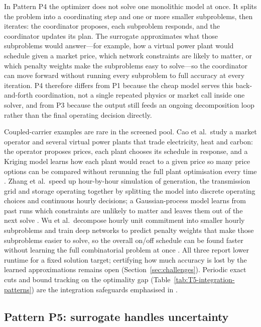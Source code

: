 In Pattern P4 the optimizer does not solve one monolithic model at once.
It splits the problem into a coordinating step and one or more smaller
subproblems, then iterates: the coordinator proposes, each subproblem
responds, and the coordinator updates its plan.
The surrogate approximates what those subproblems would answer---for
example, how a virtual power plant would schedule given a market price,
which network constraints are likely to matter, or which penalty
weights make the subproblems easy to solve---so the coordinator can move
forward without running every subproblem to full accuracy at every
iteration.
P4 therefore differs from P1 because the cheap model serves this
back-and-forth coordination, not a single repeated physics or market
call inside one solver, and from P3 because the output still feeds an
ongoing decomposition loop rather than the final operating decision
directly.

Coupled-carrier examples are rare in the screened pool. Cao et al.\
study a market operator and several virtual power plants that trade
electricity, heat and carbon: the operator proposes prices, each plant
chooses its schedule in response, and a Kriging model learns how each
plant would react to a given price so many price options can be compared
without rerunning the full plant optimisation every time
\cite{Cao2023__2}. Zhang et al.\ speed up hour-by-hour simulation of
generation, the transmission grid and storage operating together by
splitting the model into discrete operating choices and continuous
hourly decisions; a Gaussian-process model learns from past runs which
constraints are unlikely to matter and leaves them out of the next solve
\cite{Zhang2025__4}. Wu et al.\ decompose hourly unit commitment into
smaller hourly subproblems and train deep networks to predict penalty
weights that make those subproblems easier to solve, so the overall
on/off schedule can be found faster without learning the full
combinatorial problem at once \cite{Wu2024391}. All
three report lower runtime for a fixed solution target; certifying how
much accuracy is lost by the learned approximations remains open
(Section~\ref{sec:challenges}).
Periodic exact cuts and bound tracking on the optimality gap
(Table~\ref{tab:T5-integration-patterns}) are the integration safeguards
emphasised in \cite{Zhang2025__4,Wu2024391}.

\subsection{Pattern P5: surrogate handles uncertainty}
\label{sec:int:uncertainty}

